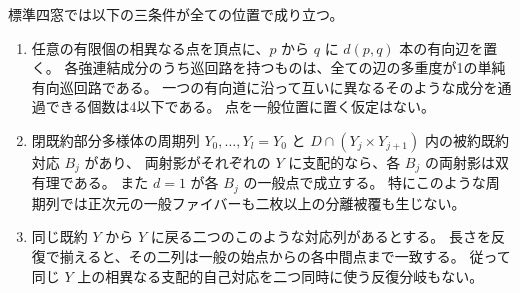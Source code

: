 \begin{theorem}\label{thm:recurrent-point-correspondences}
標準四窓では以下の三条件が全ての位置で成り立つ。
\begin{enumerate}
\item 任意の有限個の相異なる点を頂点に、$p$ から $q$ に $d(p,q)$ 本の有向辺を置く。
各強連結成分のうち巡回路を持つものは、全ての辺の多重度が1の単純有向巡回路である。
一つの有向道に沿って互いに異なるそのような成分を通過できる個数は4以下である。
点を一般位置に置く仮定はない。
\item 閉既約部分多様体の周期列 $Y_0,\ldots,Y_l=Y_0$ と
$D\cap(Y_j\times Y_{j+1})$ 内の被約既約対応 $B_j$ があり、
両射影がそれぞれの $Y$ に支配的なら、各 $B_j$ の両射影は双有理である。
また $d=1$ が各 $B_j$ の一般点で成立する。
特にこのような周期列では正次元の一般ファイバーも二枚以上の分離被覆も生じない。
\item 同じ既約 $Y$ から $Y$ に戻る二つのこのような対応列があるとする。
長さを反復で揃えると、その二列は一般の始点からの各中間点まで一致する。
従って同じ $Y$ 上の相異なる支配的自己対応を二つ同時に使う反復分岐もない。
\end{enumerate}
\end{theorem}
